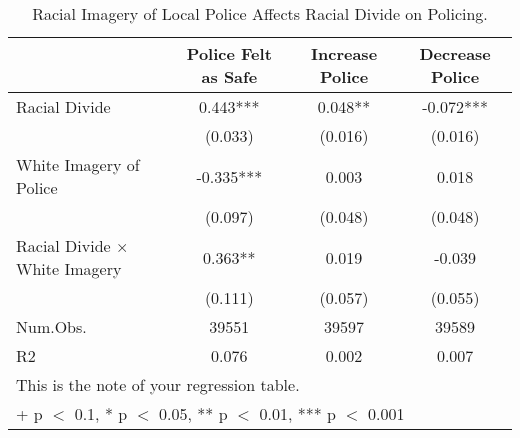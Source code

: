 \begin{table}

\caption{Racial Imagery of Local Police Affects Racial Divide on Policing.}
\centering
\begin{tabular}[t]{lccc}
\toprule
  & Police Felt as Safe & Increase Police & Decrease Police\\
\midrule
Racial Divide & 0.443*** & 0.048** & -0.072***\\
 & (0.033) & (0.016) & (0.016)\\
White Imagery of Police & -0.335*** & 0.003 & 0.018\\
 & (0.097) & (0.048) & (0.048)\\
Racial Divide × White Imagery & 0.363** & 0.019 & -0.039\\
 & (0.111) & (0.057) & (0.055)\\
\midrule
Num.Obs. & 39551 & 39597 & 39589\\
R2 & 0.076 & 0.002 & 0.007\\
\bottomrule
\multicolumn{4}{l}{\rule{0pt}{1em}This is the note of your regression table.}\\
\multicolumn{4}{l}{\rule{0pt}{1em}+ p $<$ 0.1, * p $<$ 0.05, ** p $<$ 0.01, *** p $<$ 0.001}\\
\end{tabular}
\end{table}
